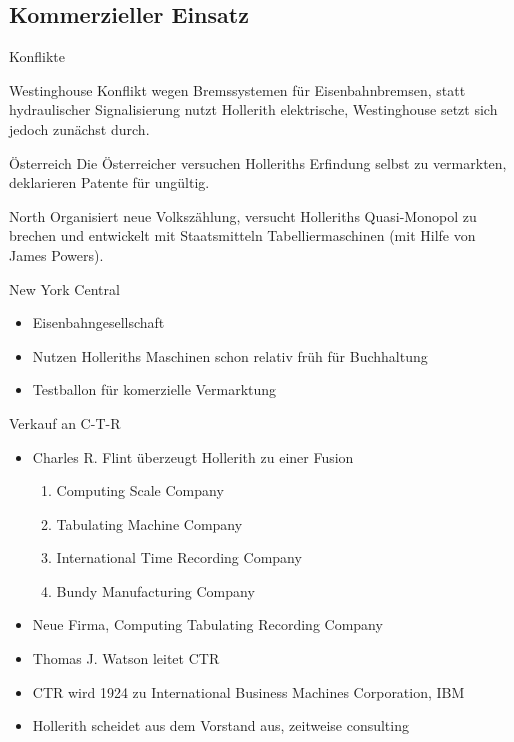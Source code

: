 \documentclass[EU2]{beamer}
\begin{document}
\subsection{Kommerzieller Einsatz}

\begin{frame}{Konflikte}
  \begin{block}{Westinghouse}
    Konflikt wegen Bremssystemen für Eisenbahnbremsen, statt hydraulischer
    Signalisierung nutzt Hollerith elektrische, Westinghouse setzt sich jedoch
    zunächst durch.
  \end{block}
  \begin{block}{Österreich}
    Die Österreicher versuchen Holleriths Erfindung selbst zu vermarkten,
    deklarieren Patente für ungültig.
  \end{block}
  \begin{block}{North}
    Organisiert neue Volkszählung, versucht Holleriths Quasi-Monopol zu brechen
    und entwickelt mit Staatsmitteln Tabelliermaschinen (mit Hilfe von James Powers).
  \end{block}
\end{frame}

\begin{frame}{New York Central}
  \begin{itemize}
    \item Eisenbahngesellschaft
    \item Nutzen Holleriths Maschinen schon relativ früh für Buchhaltung
    \item Testballon für komerzielle Vermarktung
  \end{itemize}
\end{frame}

\begin{frame}{Verkauf an C-T-R}
  \begin{itemize}
    \item Charles R. Flint überzeugt Hollerith zu einer Fusion
      \begin{enumerate}
        \item Computing Scale Company
        \item Tabulating Machine Company
	\item International Time Recording Company
	\item Bundy Manufacturing Company
      \end{enumerate}
    \item Neue Firma, Computing Tabulating Recording Company
    \item Thomas J. Watson leitet CTR
    \item CTR wird 1924 zu International Business Machines Corporation, IBM
    \item Hollerith scheidet aus dem Vorstand aus, zeitweise consulting
  \end{itemize}
\end{frame}
\end{document}
